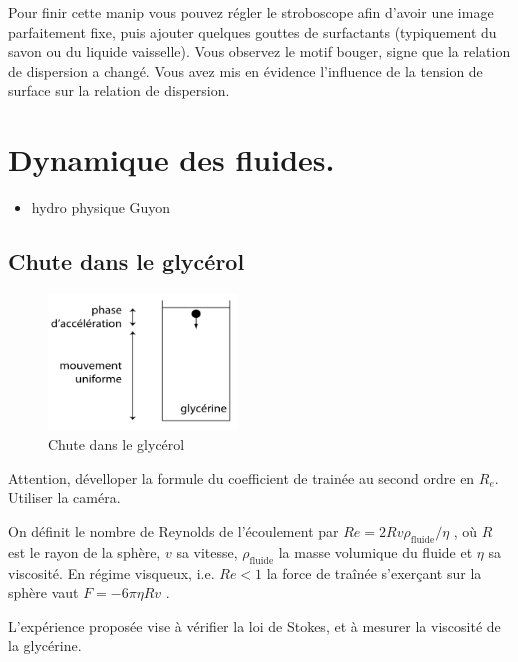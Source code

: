 \documentclass{article}%
\begin{document}
Pour finir cette manip vous pouvez régler le stroboscope afin d'avoir une image parfaitement fixe, puis ajouter quelques gouttes de surfactants (typiquement du savon ou du liquide vaisselle). Vous observez le motif bouger, signe que la relation de dispersion a changé. Vous avez mis en évidence l'influence de la tension de surface sur la relation de dispersion. 

\section{Dynamique des fluides.}
\begin{itemize}
	\item hydro physique Guyon
\end{itemize}
\subsection{Chute dans le glycérol}

\begin{figure}
	\centerline{\includegraphics[width=5cm]{images-exp/chute_bille_glycerol.png}}
 \caption{Chute dans le glycérol}
\end{figure}

Attention, dévelloper la formule du coefficient de trainée au second ordre en $R_e$. Utiliser la caméra.

On définit le nombre de Reynolds de l'écoulement par $Re=2 R v \rho_\textrm{fluide}/ \eta$ , où $R$ est le rayon de la sphère, $v$ sa vitesse, $\rho_\textrm{fluide}$ la masse volumique du fluide et $\eta$ sa viscosité. En régime visqueux, i.e. $Re < 1$ la force de traînée s'exerçant sur la sphère vaut $F = -6\pi\eta R v$ .

L'expérience proposée vise à vérifier la loi de Stokes, et à mesurer la viscosité de la glycérine. 
\end{document}
